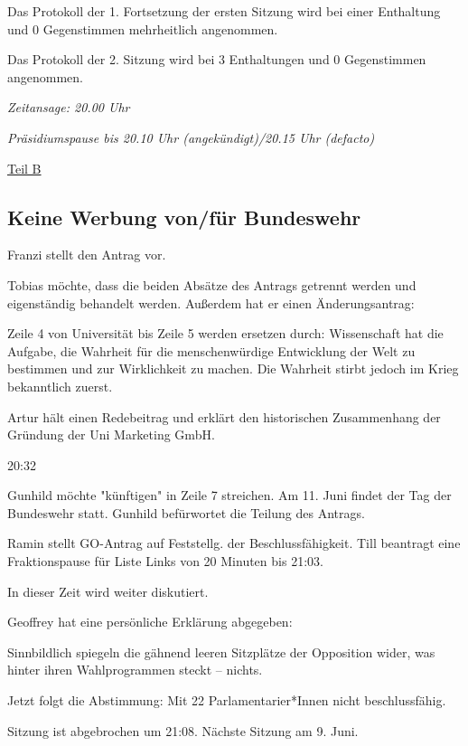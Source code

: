 \documentclass[ngerman,headheight=70pt]{scrartcl}
\begin{document}
    Das Protokoll der 1. Fortsetzung der ersten Sitzung wird bei einer Enthaltung
    und 0 Gegenstimmen mehrheitlich angenommen.

    Das Protokoll der 2. Sitzung  wird bei 3 Enthaltungen und 0 Gegenstimmen
    angenommen.

    \textit{Zeitansage: 20.00 Uhr}

    \textit{Präsidiumspause bis 20.10 Uhr (angekündigt)/20.15 Uhr (defacto)}

    \newpage
    {\Large \underline{Teil B}}


    \subsection{Keine Werbung von/für Bundeswehr}

    Franzi stellt den Antrag vor.

    Tobias möchte, dass die beiden Absätze des Antrags getrennt werden
    und eigenständig behandelt werden. Außerdem hat er einen Änderungsantrag:

    Zeile 4 von Universität bis Zeile 5 werden ersetzen durch:
    Wissenschaft hat die Aufgabe, die Wahrheit für die menschenwürdige
    Entwicklung der Welt zu bestimmen und zur Wirklichkeit zu machen. Die
    Wahrheit stirbt jedoch im Krieg bekanntlich zuerst.

    Artur hält einen Redebeitrag und erklärt den historischen Zusammenhang
    der Gründung der Uni Marketing GmbH.

    20:32

    Gunhild möchte "künftigen" in Zeile 7 streichen. Am 11. Juni findet
    der Tag der Bundeswehr statt. Gunhild befürwortet die Teilung des Antrags.

    Ramin stellt GO-Antrag auf Feststellg. der Beschlussfähigkeit. Till beantragt
    eine Fraktionspause für Liste Links von 20 Minuten bis 21:03.

    In dieser Zeit wird weiter diskutiert.

    Geoffrey hat eine persönliche Erklärung abgegeben:

    Sinnbildlich spiegeln die gähnend leeren Sitzplätze der Opposition
    wider, was hinter ihren Wahlprogrammen steckt -- nichts.

    Jetzt folgt die Abstimmung: Mit 22 Parlamentarier*Innen nicht beschlussfähig.

    Sitzung ist abgebrochen um 21:08. Nächste Sitzung am 9. Juni.
\end{document}
